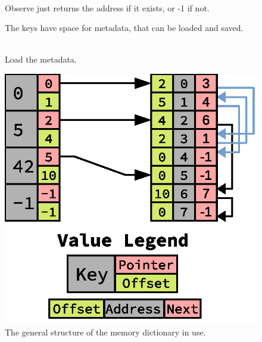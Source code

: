 \begin{description}
  \item[]\hfill\\
  Observe just returns the address if it exists, or -1 if not.

  \item[{}]\hfill

  The keys have space for metadata, that can be loaded and saved.

  \item[]\hfill\\
  Load the metadata.

\end{description}

\begin{figure}
	\centering
	\includegraphics[width=\linewidth]{implementation/memory_dictionary.eps}
	\caption{The general structure of the memory dictionary in use.}
	\label{fig:memory_dictionary_explained}
\end{figure}



